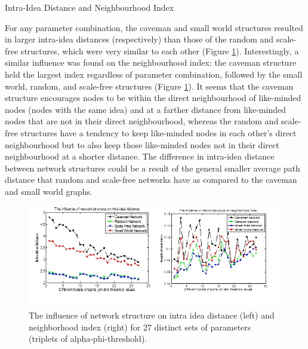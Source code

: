 \documentclass{beamer}
\begin{document}
%
\begin{frame}
{Intra-Idea Distance and Neighbourhood Index}

For any parameter combination, the caveman and small world structures resulted in larger intra-idea distances (respectively) than those of the random and scale-free structures, which were very similar to each other (Figure \ref{fig1}). Interestingly, a similar influence was found on the neighbourhood index: the caveman structure held the largest index regardless of parameter combination, followed by the small world, random, and scale-free structures (Figure \ref{fig1}). It seems that the caveman structure encourages nodes to be within the direct neighbourhood of like-minded nodes (nodes with the same idea) and at a farther distance from like-minded nodes that are not in their direct neighbourhood, whereas the random and scale-free structures have a tendency to keep like-minded nodes in each other's direct neighbourhood but to also keep those like-minded nodes not in their direct neighbourhood at a shorter distance. The difference in intra-idea distance between network structures could be a result of the general smaller average path distance that random and scale-free networks have as compared to the caveman and small world graphs.

\begin{figure}
[htp]
\begin{center}
\includegraphics{Fig1}
\end{center}
\caption{The influence of network structure on intra idea distance (left) and neighborhood index (right) for 27 distinct sets of parameters (triplets of alpha-phi-threshold).}
\label {fig1}
\end{figure}

\end{frame}
%
\end{document}
